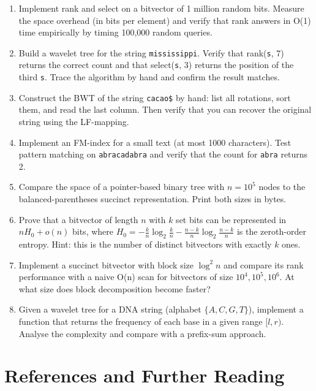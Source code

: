 \begin{enumerate}
\item Implement rank and select on a bitvector of 1 million random bits. Measure the space overhead (in bits per element) and verify that rank answers in O(1) time empirically by timing 100{,}000 random queries.

\item Build a wavelet tree for the string \texttt{mississippi}. Verify that rank(\texttt{s}, 7) returns the correct count and that select(\texttt{s}, 3) returns the position of the third \texttt{s}. Trace the algorithm by hand and confirm the result matches.

\item Construct the BWT of the string \texttt{cacao\$} by hand: list all rotations, sort them, and read the last column. Then verify that you can recover the original string using the LF-mapping.

\item Implement an FM-index for a small text (at most 1000 characters). Test pattern matching on \texttt{abracadabra} and verify that the count for \texttt{abra} returns 2.

\item Compare the space of a pointer-based binary tree with $n = 10^5$ nodes to the balanced-parentheses succinct representation. Print both sizes in bytes.

\item Prove that a bitvector of length $n$ with $k$ set bits can be represented in $n H_0 + o(n)$ bits, where $H_0 = -\frac{k}{n}\log_2\frac{k}{n} - \frac{n-k}{n}\log_2\frac{n-k}{n}$ is the zeroth-order entropy. Hint: this is the number of distinct bitvectors with exactly $k$ ones.

\item Implement a succinct bitvector with block size $\log^2 n$ and compare its rank performance with a naive O(n) scan for bitvectors of size $10^4, 10^5, 10^6$. At what size does block decomposition become faster?

\item Given a wavelet tree for a DNA string (alphabet $\{A, C, G, T\}$), implement a function that returns the frequency of each base in a given range $[l, r)$. Analyse the complexity and compare with a prefix-sum approach.
\end{enumerate}

\section{References and Further Reading}\label{sec22:references}

